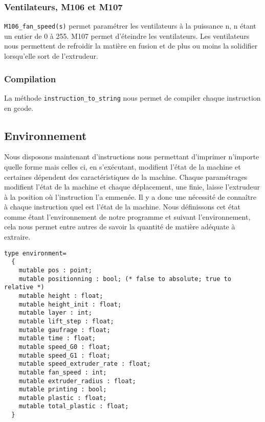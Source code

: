 \documentclass[11pt, titlepage]{article}
\begin{document}
	\subsubsection{Ventilateurs, M106 et M107}
	\verb&M106_fan_speed(s)& permet paramétrer les ventilateurs à la puissance n, n étant un entier de 0 à 255.
M107 permet d'éteindre les ventilateurs.
Les ventilateurs nous permettent de refroidir la matière en fusion et de plus ou moins la solidifier lorsqu'elle sort de l'extrudeur.
	\subsubsection{Compilation}
	La méthode \verb&instruction_to_string& nous permet de compiler chaque instruction en gcode.

\subsection{Environnement}
Nous disposons maintenant d'instructions nous permettant d'imprimer n'importe quelle forme mais celles ci, en s'exécutant, modifient l'état de la machine et certaines dépendent des caractéristiques de la machine. Chaque paramétrages modifient l'état de la machine et chaque déplacement, une finie, laisse l'extrudeur à la position où l'instruction l'a emmenée. Il y a donc une nécessité de connaître à chaque instruction quel est l'état de la machine. Nous définissons cet état comme étant l'environnement de notre programme et suivant l'environnement, cela nous permet entre autres de savoir la quantité de matière adéquate à extraire.

\begin{lstlisting}
type environment=
  {
    mutable pos : point;
    mutable positionning : bool; (* false to absolute; true to relative *)
    mutable height : float;
    mutable height_init : float;
    mutable layer : int;
    mutable lift_step : float;
    mutable gaufrage : float;
    mutable time : float;
    mutable speed_G0 : float;
    mutable speed_G1 : float;
    mutable speed_extruder_rate : float;
    mutable fan_speed : int;
    mutable extruder_radius : float;
    mutable printing : bool;
    mutable plastic : float;
    mutable total_plastic : float;
  }
\end{lstlisting}
\end{document}
